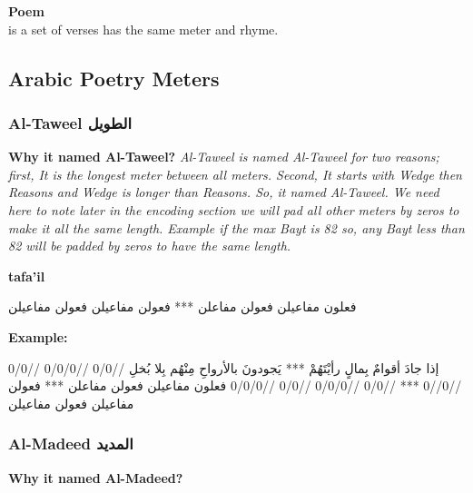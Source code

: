 \begin{definition}\label{def:poem}
  \textbf{Poem} \hfill \\
  is a set of verses has the same meter and rhyme.  

\end{definition}

    
\newpage

\subsection{Arabic Poetry Meters}

\subsubsection{Al-Taweel \textarabic{الطويل}}
\textbf{Why it named Al-Taweel?}
\textit{Al-Taweel is named Al-Taweel for two reasons; first, It is the longest meter between all meters. Second, It starts with Wedge then Reasons and Wedge is longer than Reasons. So, it named Al-Taweel. We need here to note later in the encoding section we will pad all other meters by zeros to make it all the same length. Example if the max Bayt is 82 so, any Bayt less than 82 will be padded by zeros to have the same length.}

\textbf{tafa'il}

\begin{Arabic}
	\begin{traditionalpoem*}
          فعلون مفاعيلن فعولن مفاعلن *** فعولن مفاعيلن فعولن مفاعيلن 


	\end{traditionalpoem*}
      \end{Arabic}

\textbf{Example:}
\begin{Arabic}
	\begin{traditionalpoem*}
          إذا جادَ أقوامٌ بِمالٍ رأيْتَهُمْ  *** يَجودونَ بالأرواحِ مِنْهُم بِلا بُخلِ
          //0/0 //0/0/0 //0/0 //0//0 *** //0/0 //0/0/0 //0/0 //0/0/0 
          فعلون مفاعيلن فعولن مفاعلن *** فعولن مفاعيلن فعولن مفاعيلن 
          
	\end{traditionalpoem*}
      \end{Arabic}
      

\subsubsection{Al-Madeed \textarabic{المديد}}
\textbf{Why it named Al-Madeed?}

